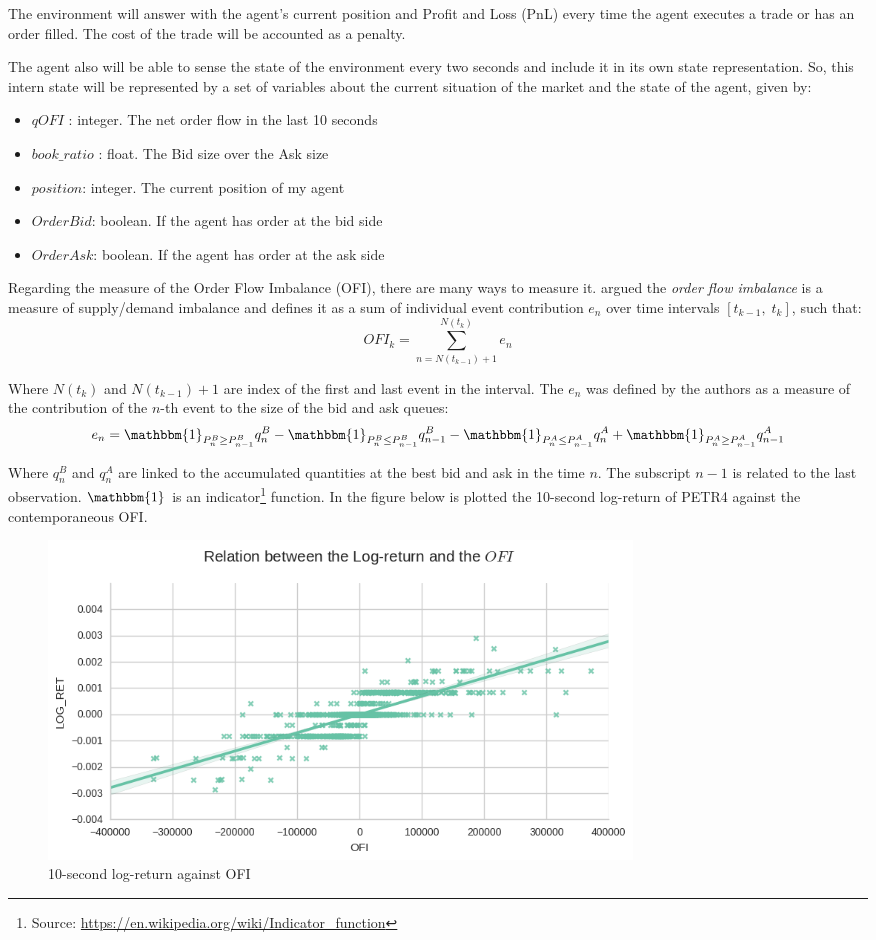 \documentclass[a4paper]{article}
\begin{document}
The environment will answer with the agent's current position and Profit and Loss (PnL) every time the agent executes a trade or has an order filled. The cost of the trade will be accounted as a penalty.

The agent also will be able to sense the state of the environment every two seconds and include it in its own state representation. So, this intern state will be represented by a set of variables about the current situation of the market and the state of the agent, given by:

\begin{itemize}
\item $qOFI$ : integer. The net order flow in the last 10 seconds
\item $book\_ratio$ : float. The Bid size over the Ask size
\item $position$: integer. The current position of my agent
\item $OrderBid$: boolean. If the agent has order at the bid side
\item $OrderAsk$: boolean. If the agent has order at the ask side
\end{itemize}

Regarding the measure of the Order Flow Imbalance (OFI), there are many ways to measure it. \cite{cont2014price} argued the \textit{order flow imbalance} is a measure of supply/demand imbalance and defines it as a sum of individual event contribution $e_n$ over time intervals $\left[ t_{k-1}, \; t_k \right]$, such that:
$$OFI_k = \sum^{N(t_k)}_{n=N(t_{k-1})+1} e_n$$

Where $N(t_k)$ and $N(t_{k-1}) + 1$ are index of the first and last event in the interval. The $e_n$ was defined by the authors as a measure of the contribution of the $n$-th event to the size of the bid and ask queues:
$$e_n = \mathbbm{1}_{P_{n}^{B} \geq P_{n-1}^{B}} q^{B}_{n} - \mathbbm{1}_{P_{n}^{B} \leq P_{n-1}^{B}}  q^{B}_{n-1} - \mathbbm{1}_{P_{n}^{A} \leq P_{n-1}^{A}} q^{A}_{n} + \mathbbm{1}_{P_{n}^{A} \geq P_{n-1}^{A}}  q^{A}_{n-1}$$

Where $q^{B}_{n}$ and $q^{A}_{n}$ are linked to the accumulated quantities at the best bid and ask in the time $n$. The subscript $n-1$ is related to the last observation. $\mathbbm{1}$ is an indicator\footnote{Source: \url{https://en.wikipedia.org/wiki/Indicator_function}} function. In the figure below is plotted the 10-second log-return of PETR4 against the contemporaneous OFI.

\begin{figure}[ht!]
\centering
\includegraphics[width=0.75\textwidth]{figures/ofi_logret.png}
\caption{\label{fig:ofi_linear}10-second log-return against OFI}
\end{figure}
\end{document}
